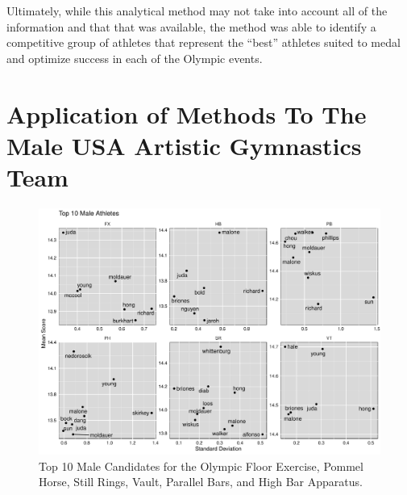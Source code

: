 \documentclass[12pt]{article}
\begin{document}
Ultimately, while this analytical method may not take into account all of the information and that that was available, 
the method was able to identify a competitive group of athletes that represent the ``best'' athletes suited 
to medal and optimize success in each of the Olympic events.


\appendix

\section{Application of Methods To The Male USA Artistic Gymnastics Team}
\label{appendix:men}

\begin{figure}
  \centering
  \includegraphics[scale=0.5]{FinalMaleApparatusPlot.pdf}
  \caption{Top 10 Male Candidates for the Olympic Floor Exercise, Pommel Horse, Still Rings, Vault, Parallel Bars, 
  and High Bar Apparatus.}
  \label{fig:MA}
\end{figure}
\end{document}
